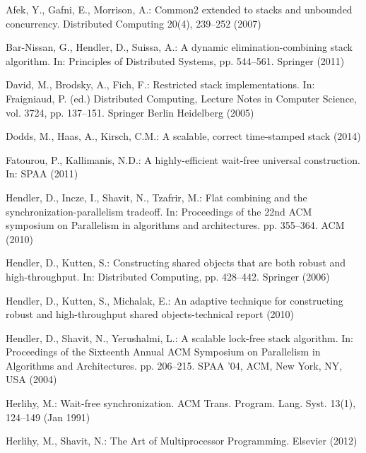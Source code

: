 \documentclass{llncs}
\begin{document}
\vspace{-2mm}

\begin{thebibliography}{10}
\providecommand{\url}[1]{\texttt{#1}}
\providecommand{\urlprefix}{URL }

Afek, Y., Gafni, E., Morrison, A.: Common2 extended to stacks and unbounded
  concurrency. Distributed Computing  20(4),  239--252 (2007)

Bar-Nissan, G., Hendler, D., Suissa, A.: A dynamic elimination-combining stack
  algorithm. In: Principles of Distributed Systems, pp. 544--561. Springer
  (2011)

David, M., Brodsky, A., Fich, F.: Restricted stack implementations. In:
  Fraigniaud, P. (ed.) Distributed Computing, Lecture Notes in Computer
  Science, vol. 3724, pp. 137--151. Springer Berlin Heidelberg (2005)

Dodds, M., Haas, A., Kirsch, C.M.: A scalable, correct time-stamped stack
  (2014)

Fatourou, P., Kallimanis, N.D.: A highly-efficient wait-free universal
  construction. In: SPAA (2011)

Hendler, D., Incze, I., Shavit, N., Tzafrir, M.: Flat combining and the
  synchronization-parallelism tradeoff. In: Proceedings of the 22nd ACM
  symposium on Parallelism in algorithms and architectures. pp. 355--364. ACM
  (2010)

Hendler, D., Kutten, S.: Constructing shared objects that are both robust and
  high-throughput. In: Distributed Computing, pp. 428--442. Springer (2006)

Hendler, D., Kutten, S., Michalak, E.: An adaptive technique for constructing
  robust and high-throughput shared objects-technical report (2010)

Hendler, D., Shavit, N., Yerushalmi, L.: A scalable lock-free stack algorithm.
  In: Proceedings of the Sixteenth Annual ACM Symposium on Parallelism in
  Algorithms and Architectures. pp. 206--215. SPAA '04, ACM, New York, NY, USA
  (2004)

Herlihy, M.: Wait-free synchronization. ACM Trans. Program. Lang. Syst.  13(1),
   124--149 (Jan 1991)

Herlihy, M., Shavit, N.: The Art of Multiprocessor Programming. Elsevier (2012)


\end{thebibliography}
\end{document}

